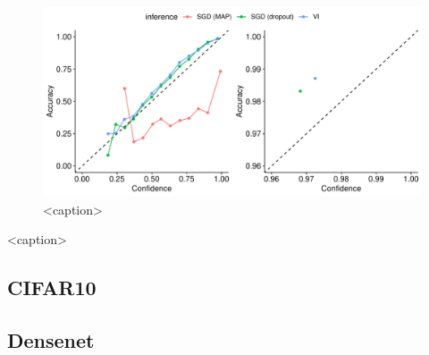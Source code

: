 \begin{figure}[htbp]
    \centering
    \includegraphics[width=\linewidth]{Figures/cifar10-small-calibration.pdf}
    \caption{<caption>}
    \label{<label>}
\end{figure}
\begin{table}[htbp]
    \centering
    
    \caption{<caption>}
    \label{<label>}
\end{table}

\subsection{CIFAR10}

\subsection{Densenet}


